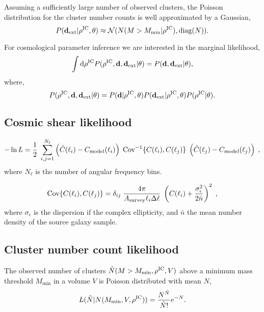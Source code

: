 \documentclass[preprint]{aastex}
\newcommand{\data}{\mathbf{d}}
\newcommand{\dataext}{\data_{\rm ext}}
\newcommand{\rhoic}{\rho^{\rm IC}}
\newcommand{\normdist}{\mathcal{N}}
\newcommand{\nclust}{N}
\newcommand{\nhatclust}{\hat{N}}
\newcommand{\Mmin}{M_\text{min}}
\begin{document}
Assuming a sufficiently large number of observed clusters, the Poisson distribution 
for the cluster number counts is well approximated by a Gaussian,
\begin{equation}
	P(\dataext|\rho^\text{IC},\theta) \approx \normdist(\nclust(M>M_\text{min} |
	\rho^\text{IC}), {\rm diag}(\nclust)).
\end{equation}

For cosmological parameter inference we are interested in the marginal likelihood,
\begin{equation}
	\int \mathrm{d}\rho^\text{IC} P(\rho^\text{IC}, \data,\dataext |\theta) 
	= P(\data, \dataext | \theta),
\end{equation}
where,
\begin{equation}
	P(\rho^\text{IC}, \data,\dataext| \theta) =
	P(\data|\rho^\text{IC},\theta)P(\dataext|\rho^\text{IC},\theta)P(\rho^\text{IC}|\theta).
\end{equation}



\subsection{Cosmic shear likelihood}

\begin{equation}
- \ln L = \frac{1}{2}\; \sum_{i,j=1}^{N_\ell} \left(  \hat{C}(\ell_i) - C_{\rm model}(\ell_i) \right)\; {\rm Cov}^{-1}\{  C(\ell_i), C(\ell_j) \}\; \left(  \hat{C}(\ell_j) - C_{\rm model}(\ell_j) \right)\;,
\end{equation}
where $N_\ell$ is the number of angular frequency bins.

\begin{equation}
{\rm Cov}\{  C(\ell_i), C(\ell_j) \}= \delta_{ij}\; \frac{4 \pi}{A_{\rm survey} \ell_i \Delta \ell}\; \left( C(\ell_i) + \frac{\sigma_\epsilon^2}{2 \bar{n}} \right)^2\;,
\end{equation}
where $\sigma_\epsilon$ is the dispersion if the complex ellipticity, and $\bar{n}$ the mean number density of the source galaxy sample.


\subsection{Cluster number count likelihood}
The observed number of clusters $\nhatclust(M>\Mmin,\rhoic, V)$ above a minimum mass threshold 
$\Mmin$ in a volume $V$ is Poisson distributed with mean $\nclust$,
\begin{equation}
	L(\nhatclust|\nclust(\Mmin, V, \rhoic)) = 
	\frac{\nclust^{\nhatclust}}{\nhatclust!} 
	e^{-\nclust}. 
\end{equation}
\end{document}
